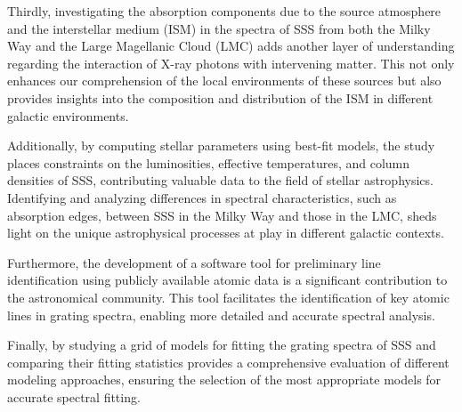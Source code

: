     	Thirdly, investigating the absorption components due to the source atmosphere and the interstellar medium (ISM) in the spectra of SSS from both the Milky Way and the Large Magellanic Cloud (LMC) adds another layer of understanding regarding the interaction of X-ray photons with intervening matter. This not only enhances our comprehension of the local environments of these sources but also provides insights into the composition and distribution of the ISM in different galactic environments.
    	
    	Additionally, by computing stellar parameters using best-fit models, the study places constraints on the luminosities, effective temperatures, and column densities of SSS, contributing valuable data to the field of stellar astrophysics. Identifying and analyzing differences in spectral characteristics, such as absorption edges, between SSS in the Milky Way and those in the LMC, sheds light on the unique astrophysical processes at play in different galactic contexts.
    	
    	Furthermore, the development of a software tool for preliminary line identification using publicly available atomic data is a significant contribution to the astronomical community. This tool facilitates the identification of key atomic lines in grating spectra, enabling more detailed and accurate spectral analysis.
    	
    	Finally, by studying a grid of models for fitting the grating spectra of SSS and comparing their fitting statistics provides a comprehensive evaluation of different modeling approaches, ensuring the selection of the most appropriate models for accurate spectral fitting.
%        
%        
    
